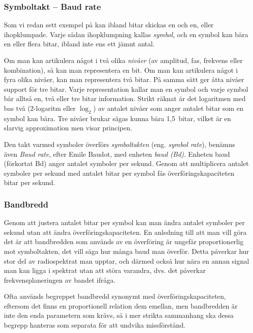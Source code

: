 \subsubsection{Symboltakt -- Baud rate}

Som vi redan sett exempel på kan ibland bitar skickas en och en, eller
ihopklumpade. Varje sådan ihopklumpning kallas \emph{symbol}, och en symbol
kan bära en eller flera bitar, ibland inte ens ett jämnt antal.

Om man kan artikulera något i två olika \emph{nivåer} (av amplitud, fas,
frekvens eller kombination), så kan man representera en bit.
Om man kan artikulera något i fyra olika nivåer, kan man representera två bitar.
På samma sätt ger åtta nivåer support för tre bitar.
Varje representation kallar man en symbol och varje symbol bär alltså en, två
eller tre bitar information.
Strikt räknat är det logaritmen med bas två (2-logaritm eller $\log_{2}$) av
antalet nivåer som anger antalet bitar som en symbol kan bära.
Tre nivåer brukar sägas kunna bära 1,5~bitar, vilket är en slarvig approximation
men visar principen.

Den takt varmed symboler överförs \emph{symboltakten} (eng. \emph{symbol rate}),
benämns även \emph{Baud rate}, efter Emile Baudot, med enheten \emph{baud (Bd)}.
Enheten baud (förkortat Bd) anger antalet symboler per sekund.
Genom att multiplicera antalet symboler per sekund med antalet bitar per symbol
fås överföringskapaciteten bitar per sekund.

\subsubsection{Bandbredd}

Genom att justera antalet bitar per symbol kan man ändra antalet symboler
per sekund utan att ändra överföringskapaciteten. En anledning till att man
vill göra det är att bandbredden som används av en överföring är ungefär
proportionerlig mot symboltakten, det vill säga hur många baud man överför.
Detta påverkar hur stor del av radiospektrat man upptar, och därmed också hur
nära en annan signal man kan ligga i spektrat utan att störa varandra, dvs.
det påverkar frekvensplaneringen av bandet ifråga.

Ofta används begreppet bandbredd synonymt med överföringskapaciteten, eftersom
det finns en proportionell relation dem emellan, men bandbredden är inte den
enda parametern som krävs, så i mer strikta sammanhang ska dessa begrepp
hanteras som separata för att undvika missförstånd.

